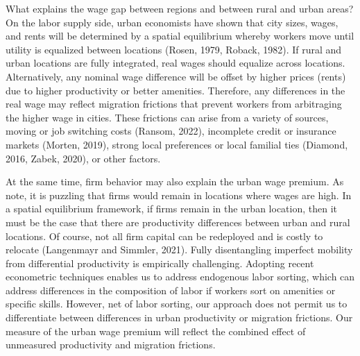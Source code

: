 \documentclass[12pt,twoside]{article}
\begin{document}
What explains the wage gap between regions and between rural and urban areas?
On the labor supply side, urban economists have shown that city sizes, wages, and rents will be determined by a spatial equilibrium whereby workers move until utility is equalized between locations (Rosen, 1979, Roback, 1982). 
If rural and urban locations are fully integrated, real wages should equalize across locations.
Alternatively, any nominal wage difference will be offset by higher prices (rents) due to higher productivity or better amenities.
Therefore, any differences in the real wage may reflect migration frictions that prevent workers from arbitraging the higher wage in cities.  
These frictions can arise from a variety of sources, moving or job switching costs (Ransom, 2022), incomplete credit or insurance markets (Morten, 2019), strong local preferences or local familial ties (Diamond, 2016, Zabek, 2020), or other factors.

At the same time, firm behavior may also explain the urban wage premium. 
As  \citet{Glaeser_Mare_2001} note, it is puzzling that firms would remain in locations where wages are high.
In a spatial equilibrium framework, if firms remain in the urban location, then it must be the case that there are productivity differences between urban and rural locations. 
Of course, not all firm capital can be redeployed and is costly to relocate (Langenmayr and Simmler, 2021).
Fully disentangling imperfect mobility from differential productivity is empirically challenging.
Adopting recent econometric techniques enables us to address endogenous labor sorting, which can address differences in the composition of labor if workers sort on amenities or specific skills. 
However, net of labor sorting, our approach does not permit us to differentiate between differences in urban productivity or migration frictions. %
Our measure of the urban wage premium will reflect the combined effect of unmeasured productivity and migration frictions. 
\end{document}
